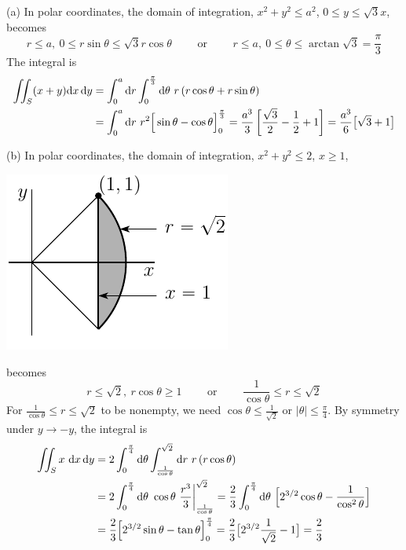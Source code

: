 \begin{solution}
(a) In polar coordinates, the domain of integration,
$x^2+y^2\le a^2$, $0\le y\le \sqrt{3}x$, becomes 
\begin{equation*}
r\le a,\ 0\le r\sin\theta\le\sqrt{3}r\cos\theta\qquad\text{ or }\qquad
r\le a,\ 0\le\theta\le \arctan\sqrt{3}=\frac{\pi}{3}
\end{equation*}
The integral is 
\begin{align*}
\dblInt_S (x+y)\dee{x}\,\dee{y}
&=\int_0^a \dee{r}\int_0^{{\pi\over 3}}\dee{\theta}\ r\,(r\cos\theta+r\sin\theta)\\
&=\int_0^a \dee{r}\ r^2\Big[\sin\theta-\cos\theta\Big]_0^{{\pi\over 3}}
=\frac{a^3}{3}\left[\frac{\sqrt{3}}{2}-\frac{1}{2}+1\right]
=\frac{a^3}{6}\big[\sqrt{3}+1\big]
\end{align*}

(b) 
In polar coordinates, the domain of integration,
$x^2+y^2\le 2$, $x\ge 1$, 

\begin{center}
     \includegraphics{fig/domain1b.pdf}
\end{center}

becomes 
\begin{equation*}
r\le \sqrt{2},\ r\cos\theta\ge 1\qquad\text{ or }\qquad
  \frac{1}{\cos\theta}\le r\le\sqrt{2}
\end{equation*}
For $\frac{1}{\cos\theta}\le r\le\sqrt{2}$ to be nonempty, we need
$\cos\theta\le \frac{1}{\sqrt{2}}$ or $|\theta|\le\frac{\pi}{4}$.
By symmetry under $y\rightarrow -y$, the integral is 
\begin{align*}
\dblInt_Sx\ \dee{x}\,\dee{y}
&=2\int_0^{{\pi\over 4}}\dee{\theta}\int_{1\over\cos\theta}^{\sqrt{2}} 
\dee{r}\ r\,(r\cos\theta)\\
&=2\int_0^{{\pi\over 4}}\dee{\theta}\ \cos\theta\ 
\frac{r^3}{3}\bigg|_{1\over\cos\theta}^{\sqrt{2}} 
=\frac{2}{3}\int_0^{{\pi\over 4}}\dee{\theta}\ 
\Big[2^{3/2}\cos\theta-\frac{1}{\cos^2\theta}\Big] \\
&=\frac{2}{3} \Big[2^{3/2}\sin\theta-\tan\theta\Big]_0^{{\pi\over 4}}
=\frac{2}{3} \big[2^{3/2}\frac{1}{\sqrt{2}}-1\big]
=\frac{2}{3}
\end{align*}


\end{solution}
